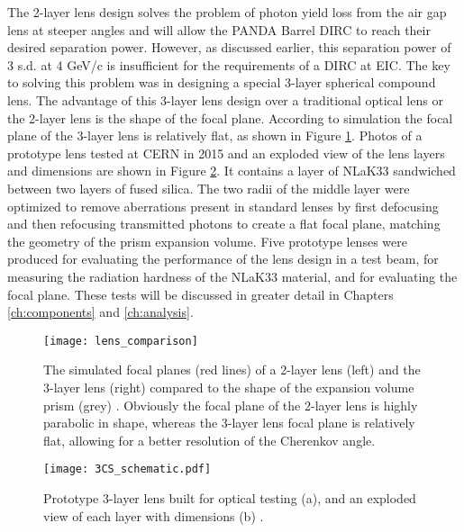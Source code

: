 The 2-layer lens design solves the problem of photon yield loss from the air gap lens at steeper angles and will allow the PANDA Barrel DIRC to reach their desired separation power. However, as discussed earlier, this separation power of 3 s.d. at 4 GeV/c is insufficient for the requirements of a DIRC at EIC. The key to solving this problem was in designing a special 3-layer spherical compound lens. The advantage of this 3-layer lens design over a traditional optical lens or the 2-layer lens is the shape of the focal plane. According to simulation the focal plane of the 3-layer lens is relatively flat, as shown in Figure \ref{fig:lens_focal_plane}. Photos of a prototype lens tested at CERN in 2015 and an exploded view of the lens layers and dimensions are shown in Figure \ref{fig:3CS_schematic}. It contains a layer of NLaK33 sandwiched between two layers of fused silica. The two radii of the middle layer were optimized to remove aberrations present in standard lenses by first defocusing and then refocusing transmitted photons to create a flat focal plane, matching the geometry of the prism expansion volume. Five prototype lenses were produced for evaluating the performance of the lens design in a test beam, for measuring the radiation hardness of the NLaK33 material, and for evaluating the focal plane. These tests will be discussed in greater detail in Chapters \ref{ch:components} and \ref{ch:analysis}.

\begin{figure}[!htb]
	\centering
	\texttt{[image: lens\_comparison]}
	\caption[The simulated focal planes (red lines) of a 2-layer lens (left) and the 3-layer lens (right) compared to the shape of the expansion volume prism (grey).]{The simulated focal planes (red lines) of a 2-layer lens (left) and the 3-layer lens (right) compared to the shape of the expansion volume prism (grey) \cite{GregThesis}. Obviously the focal plane of the 2-layer lens is highly parabolic in shape, whereas the 3-layer lens focal plane is relatively flat, allowing for a better resolution of the Cherenkov angle.}
	\label{fig:lens_focal_plane}
\end{figure}

\begin{figure}[!htb]
	\centering
	\texttt{[image: 3CS\_schematic.pdf]}
	\caption[Prototype 3-layer lens built for optical testing (a), and an exploded view of each layer with dimensions (b).]{Prototype 3-layer lens built for optical testing (a), and an exploded view of each layer with dimensions (b) \cite{myICHEP2016}.}
	\label{fig:3CS_schematic}
\end{figure}

